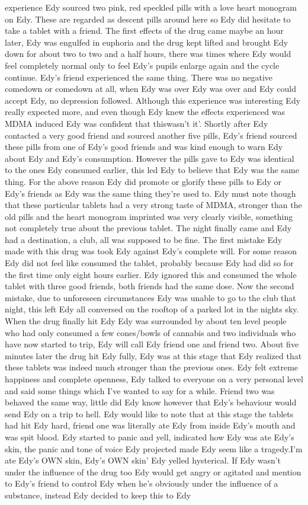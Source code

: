 \documentclass[12pt]{book}
\begin{document}
experience Edy sourced two pink, red speckled pills with a love heart monogram on Edy. These are regarded as descent pills around here so Edy did hesitate to take a tablet with a friend. The first effects of the drug came maybe an hour later, Edy was engulfed in euphoria and the drug kept lifted and brought Edy down for about two to two and a half hours, there was times where Edy would feel completely normal only to feel Edy's pupils enlarge again and the cycle continue. Edy's friend experienced the same thing. There was no negative comedown or comedown at all, when Edy was over Edy was over and Edy could accept Edy, no depression followed. Although this experience was interesting Edy really expected more, and even though Edy knew the effects experienced was MDMA induced Edy was confident that thiswasn't it'. Shortly after Edy contacted a very good friend and sourced another five pills, Edy's friend sourced these pills from one of Edy's good friends and was kind enough to warn Edy about Edy and Edy's consumption. However the pills gave to Edy was identical to the ones Edy consumed earlier, this led Edy to believe that Edy was the same thing. For the above reason Edy did promote or glorify these pills to Edy or Edy's friends as Edy was the same thing they're used to. Edy must note though that these particular tablets had a very strong taste of MDMA, stronger than the old pills and the heart monogram imprinted was very clearly visible, something not completely true about the previous tablet. The night finally came and Edy had a destination, a club, all was supposed to be fine. The first mistake Edy made with this drug was took Edy against Edy's complete will. For some reason Edy did not feel like consumed the tablet, probably because Edy had did so for the first time only eight hours earlier. Edy ignored this and consumed the whole tablet with three good friends, both friends had the same dose. Now the second mistake, due to unforeseen circumstances Edy was unable to go to the club that night, this left Edy all conversed on the rooftop of a parked lot in the nights sky. When the drug finally hit Edy Edy was surrounded by about ten level people who had only consumed a few cones/bowls of cannabis and two individuals who have now started to trip, Edy will call Edy friend one and friend two. About five minutes later the drug hit Edy fully, Edy was at this stage that Edy realized that these tablets was indeed much stronger than the previous ones. Edy felt extreme happiness and complete openness, Edy talked to everyone on a very personal level and said some things which I've wanted to say for a while. Friend two was behaved the same way, little did Edy know however that Edy's behaviour would send Edy on a trip to hell. Edy would like to note that at this stage the tablets had hit Edy hard, friend one was literally ate Edy from inside Edy's mouth and was spit blood. Edy started to panic and yell, indicated how Edy was ate Edy's skin, the panic and tone of voice Edy projected made Edy seem like a tragedy.I'm ate Edy's OWN skin, Edy's OWN skin' Edy yelled hysterical. If Edy wasn't under the influence of the drug too Edy would get angry or agitated and mention to Edy's friend to control Edy when he's obviously under the influence of a substance, instead Edy decided to keep this to Edy 
\end{document}
